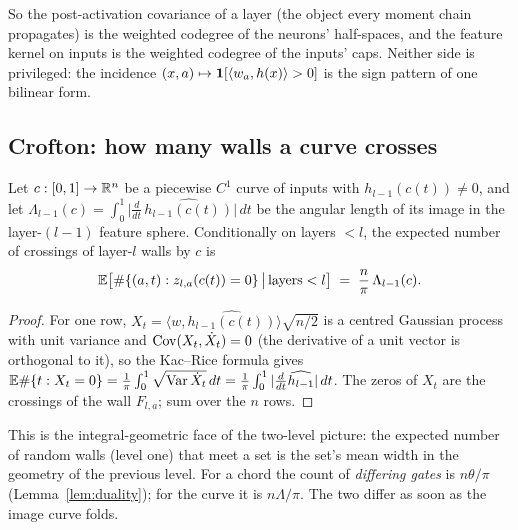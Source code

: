 So the post-activation covariance of a layer (the object every moment chain propagates) is the weighted codegree of
the neurons' half-spaces, and the feature kernel on inputs is the weighted codegree of the inputs' caps. Neither
side is privileged: the incidence $(x,a)\mapsto\mathbf 1[\langle w_a,h(x)\rangle>0]$ is the sign pattern of one bilinear
form.

\subsection{Crofton: how many walls a curve crosses}
\begin{theorem}\label{thm:crofton}
Let $c:[0,1]\to\mathbb R^n$ be a piecewise $C^1$ curve of inputs with $h_{l-1}(c(t))\neq0$, and let
$\Lambda_{l-1}(c)=\int_0^1\big|\tfrac{d}{dt}\,\widehat{h_{l-1}(c(t))}\big|\,dt$ be the angular length of its image
in the layer-$(l-1)$ feature sphere. Conditionally on layers $<l$, the expected number of crossings of layer-$l$ walls
by $c$ is
\[
\mathbb E\big[\#\{(a,t):z_{l,a}(c(t))=0\}\,\big|\,\text{layers}<l\big]\;=\;\frac{n}{\pi}\,\Lambda_{l-1}(c).
\]
\end{theorem}
\begin{proof}
For one row, $X_t=\langle w,\widehat{h_{l-1}(c(t))}\rangle\sqrt{n/2}$ is a centred Gaussian process with unit
variance and $\operatorname{Cov}(X_t,\dot X_t)=0$ (the derivative of a unit vector is orthogonal to it), so the Kac--Rice formula
gives $\mathbb E\#\{t:X_t=0\}=\tfrac1\pi\int_0^1\sqrt{\operatorname{Var}\dot X_t}\,dt=\tfrac1\pi\int_0^1|\tfrac{d}{dt}\widehat{h_{l-1}}|\,dt$.
The zeros of $X_t$ are the crossings of the wall $F_{l,a}$; sum over the $n$ rows.
\end{proof}

This is the integral-geometric face of the two-level picture: the expected number of random walls (level one)
that meet a set is the set's mean width in the geometry of the previous level. For a chord the count of
\emph{differing gates} is $n\theta/\pi$ (Lemma~\ref{lem:duality}); for the curve it is $n\Lambda/\pi$. The two differ as
soon as the image curve folds.

